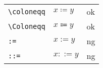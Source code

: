 \documentclass[preview]{standalone}
\newcommand{\tA}[1]{\textcolor{cA}{#1}}
\newcommand{\tD}[1]{\textcolor{cD}{#1}}
\begin{document}
\begin{table}[h]
    \centering
    \begin{tabular}{lll}
        \verb|\coloneqq| & $x\coloneqq y$ & \tA{ok} \\
        \verb|\Coloneqq| & $x\Coloneqq y$ & \tA{ok} \\
        \verb|:=|        & $x:= y$        & \tD{ng} \\
        \verb|::=|       & $x::= y$       & \tD{ng}
    \end{tabular}
\end{table}
\end{document}
